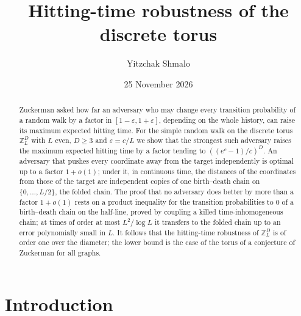 \documentclass[11pt]{amsart}
\theoremstyle{remark}
\newcommand{\eps}{\varepsilon}
\newcommand{\Z}{\mathbb{Z}}
\begin{document}
\title[Hitting-time robustness of the discrete torus]{Hitting-time robustness of the discrete torus}
\author{Yitzchak Shmalo}
\date{25 November 2026}
\address{Einstein Institute of Mathematics, The Hebrew University of Jerusalem, Jerusalem, Israel}

\begin{abstract}
Zuckerman asked how far an adversary who may change every transition probability of a random walk by a factor in
$[1-\eps,1+\eps]$, depending on the whole history, can raise its maximum expected hitting time. For the simple random
walk on the discrete torus $\Z_L^D$ with $L$ even, $D\ge3$ and $\eps=c/L$ we show that the strongest such adversary raises the
maximum expected hitting time by a factor tending to $((e^c-1)/c)^D$. An adversary that pushes every coordinate away from the
target independently is optimal up to a factor $1+o(1)$; under it, in continuous time, the distances of the coordinates from those of the target are independent copies of one birth--death chain on $\{0,\dots,L/2\}$, the folded chain. The proof that no
adversary does better by more than a factor $1+o(1)$ rests on a product inequality for the transition probabilities to $0$ of a birth--death chain on the half-line, proved
by coupling a killed time-inhomogeneous chain; at times of order at most $L^2/\log L$ it transfers to the folded chain up to
an error polynomially small in $L$. It follows that the hitting-time robustness of
$\Z_L^D$ is of order one over the diameter; the lower bound is the case of the torus of a conjecture of Zuckerman for all
graphs.
\end{abstract}

\maketitle

\section{Introduction}\label{sec:intro}
\end{document}
